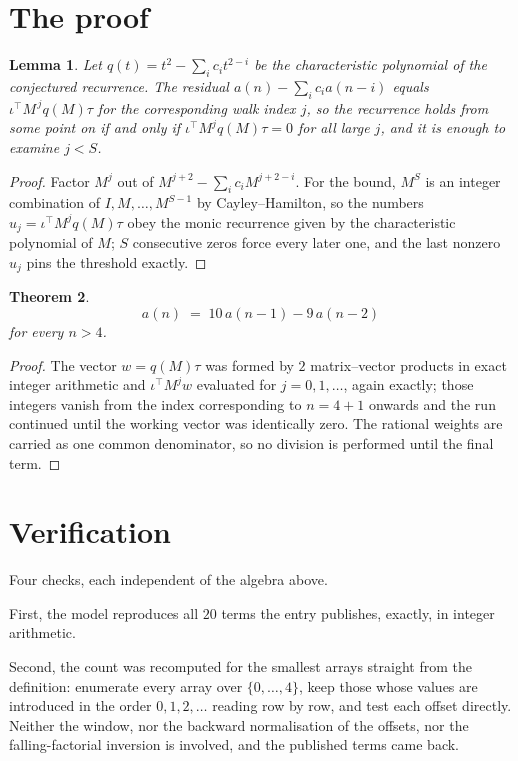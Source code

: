\documentclass[11pt,a4paper]{article}
\theoremstyle{plain}
\newtheorem{theorem}{Theorem}
\newtheorem{lemma}[theorem]{Lemma}
\theoremstyle{definition}
\begin{document}
\section{The proof}

\begin{lemma}\label{lem:crit}
Let $q(t)=t^{2}-\sum_i c_it^{2-i}$ be the characteristic polynomial of the
conjectured recurrence. The residual $a(n)-\sum_ic_ia(n-i)$ equals
$\iota^{\!\top}M^{\,j}q(M)\tau$ for the corresponding walk index $j$, so the recurrence
holds from some point on if and only if $\iota^{\!\top}M^{j}q(M)\tau=0$ for all large $j$,
and it is enough to examine $j<S$.
\end{lemma}

\begin{proof}
Factor $M^{j}$ out of $M^{j+2}-\sum_ic_iM^{j+2-i}$. For the bound, $M^{S}$
is an integer combination of $I,M,\dots,M^{S-1}$ by Cayley--Hamilton, so the numbers
$u_j=\iota^{\!\top}M^{j}q(M)\tau$ obey the monic recurrence given by the characteristic
polynomial of $M$; $S$ consecutive zeros force every later one, and the last nonzero $u_j$
pins the threshold exactly.
\end{proof}

\begin{theorem}
\[
a(n)\;=\;10\,a(n-1) - 9\,a(n-2)
\]
for every $n>4$.
\end{theorem}

\begin{proof}
The vector $w=q(M)\tau$ was formed by $2$ matrix--vector products in exact integer
arithmetic and $\iota^{\!\top}M^{j}w$ evaluated for $j=0,1,\dots$, again exactly; those
integers vanish from the index corresponding to $n=4+1$ onwards and the run continued
until the working vector was identically zero. The rational weights are carried as one common
denominator, so no division is performed until the final term.
\end{proof}

\section{Verification}

Four checks, each independent of the algebra above.

First, the model reproduces all $20$ terms the entry publishes, exactly, in integer
arithmetic.

Second, the count was recomputed for the smallest arrays straight from the definition:
enumerate every array over $\{0,\dots,4\}$, keep those whose values are introduced in the
order $0,1,2,\dots$ reading row by row, and test each offset directly. Neither the window, nor
the backward normalisation of the offsets, nor the falling-factorial inversion is involved, and
the published terms came back.
\end{document}
